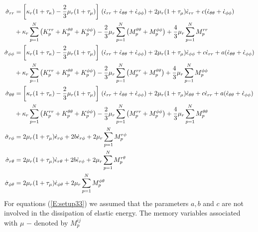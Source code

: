 \begin{subequations}\label{E:setup33}
\begin{align}
\dot{\sigma}_{rr}&=\left[\kappa_r
(1+\tau_\kappa)-\frac{2}{3}\mu_r(1+\tau_\mu)\right]\,(\dot{\epsilon}_{rr}+\dot{\epsilon}_{\theta\theta}+\dot{\epsilon}_{\phi\phi})+2\mu_r(1+\tau_\mu)\dot{\epsilon}_{rr}+c(\dot{\epsilon}_{\theta\theta}+\dot{\epsilon}_{\phi\phi})\notag\\
&+\kappa_r\sum_{p=1}^N \left(
K_{p}^{rr}+K_{p}^{\theta\theta}+K_{p}^{\phi\phi}\right)
-\frac{2}{3}\mu_r \sum_{p=1}^{N} \left(
M_p^{\theta\theta}+M_p^{\phi\phi} \right) + \frac{4}{3} \mu_r
\sum_{p=1}^{N} M_p^{rr}\\
\dot{\sigma}_{\phi\phi}&=\left[\kappa_r
(1+\tau_\kappa)-\frac{2}{3}\mu_r(1+\tau_\mu)\right]\,(\dot{\epsilon}_{rr}+\dot{\epsilon}_{\theta\theta}+\dot{\epsilon}_{\phi\phi})+2\mu_r(1+\tau_\mu)\dot{\epsilon}_{\phi\phi}+c\dot{\epsilon}_{rr}+a(\dot{\epsilon}_{\theta\theta}+\dot{\epsilon}_{\phi\phi})\notag\\
&+\kappa_r\sum_{p=1}^N \left(
K_{p}^{rr}+K_{p}^{\theta\theta}+K_{p}^{\phi\phi}\right)-\frac{2}{3}\mu_r
\sum_{p=1}^{N}
\left(M_p^{rr}+M_p^{\theta\theta}\right)+\frac{4}{3}\mu_r
\sum_{p=1}^{N} M_p^{\phi\phi}\\
\dot{\sigma}_{\theta\theta}&=\left[\kappa_r
(1+\tau_\kappa)-\frac{2}{3}\mu_r(1+\tau_\mu)\right]\,(\dot{\epsilon}_{rr}+\dot{\epsilon}_{\theta\theta}+\dot{\epsilon}_{\phi\phi})+2\mu_r(1+\tau_\mu)\dot{\epsilon}_{\theta\theta}+c\dot{\epsilon}_{rr}+a(\dot{\epsilon}_{\theta\theta}+\dot{\epsilon}_{\phi\phi})\notag\\
&+\kappa_r\sum_{p=1}^N \left(
K_{p}^{rr}+K_{p}^{\theta\theta}+K_{p}^{\phi\phi}\right)-\frac{2}{3}\mu_r
\sum_{p=1}^{N} \left(M_p^{rr}+M_p^{\phi\phi}\right)+\frac{4}{3}\mu_r
\sum_{p=1}^{N} M_p^{\theta\theta}\\
\dot{\sigma}_{r\phi}&=2\mu_r(1+\tau_\mu)\dot{\epsilon}_{r\phi}+2b\dot{\epsilon}_{r\phi}+2\mu_r\sum_{p=1}^{N}
M_p^{r\phi}\\
\dot{\sigma}_{r\theta}&=2\mu_r(1+\tau_\mu)\dot{\epsilon}_{r\theta}+2b\dot{\epsilon}_{r\phi}+2\mu_r\sum_{p=1}^{N}
M_p^{r\theta}\\
\dot{\sigma}_{\phi\theta}&=2\mu_r(1+\tau_\mu)\dot{\epsilon}_{\phi\theta}+2\mu_r
\sum_{p=1}^{N} M_p^{\phi\theta}
\end{align}
\end{subequations}
For equations (\ref{E:setup33}) we assumed that the parameters $a,
b$ and $c$ are not involved in the dissipation of elastic energy.
The memory variables associated with $\mu$ $-$ denoted by $M_p^{ij}$
